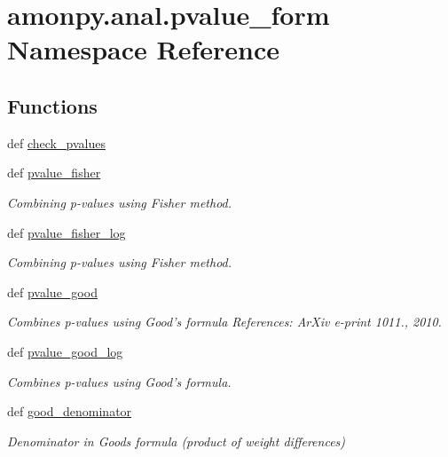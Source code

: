 \hypertarget{namespaceamonpy_1_1anal_1_1pvalue__form}{\section{amonpy.\-anal.\-pvalue\-\_\-form Namespace Reference}
\label{namespaceamonpy_1_1anal_1_1pvalue__form}
}
\subsection*{Functions}
\begin{DoxyCompactItemize}
\item 
def \hyperlink{namespaceamonpy_1_1anal_1_1pvalue__form_a828ea7843c6366d3897e6172c104de6a}{check\-\_\-pvalues}
\item 
def \hyperlink{namespaceamonpy_1_1anal_1_1pvalue__form_a670904b2f9cf749a5a19110bd02f271d}{pvalue\-\_\-fisher}
\begin{DoxyCompactList}\small\item\em Combining p-\/values using Fisher method. \end{DoxyCompactList}\item 
def \hyperlink{namespaceamonpy_1_1anal_1_1pvalue__form_aa18a5556dd27f37b93797598d69ea369}{pvalue\-\_\-fisher\-\_\-log}
\begin{DoxyCompactList}\small\item\em Combining p-\/values using Fisher method. \end{DoxyCompactList}\item 
def \hyperlink{namespaceamonpy_1_1anal_1_1pvalue__form_a668ad1e4b4f4340f31887de63f5ad752}{pvalue\-\_\-good}
\begin{DoxyCompactList}\small\item\em Combines p-\/values using Good's formula References\-: Ar\-Xiv e-\/print 1011., 2010. \end{DoxyCompactList}\item 
def \hyperlink{namespaceamonpy_1_1anal_1_1pvalue__form_aa109ec563316742673820874876406a0}{pvalue\-\_\-good\-\_\-log}
\begin{DoxyCompactList}\small\item\em Combines p-\/values using Good's formula. \end{DoxyCompactList}\item 
def \hyperlink{namespaceamonpy_1_1anal_1_1pvalue__form_aae316cb4d8782c8cbdb9564fb3d293c9}{good\-\_\-denominator}
\begin{DoxyCompactList}\small\item\em Denominator in Goods formula (product of weight differences) \end{DoxyCompactList}\end{DoxyCompactItemize}


